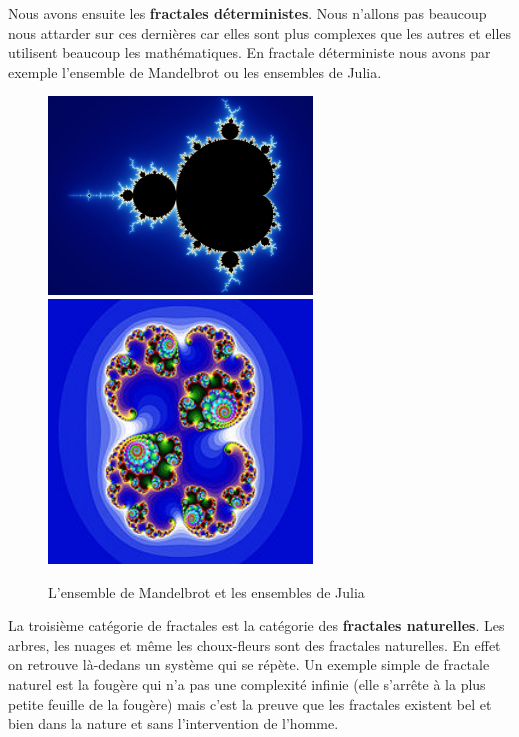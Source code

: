 \documentclass[french,11pt]{report}
\begin{document}
Nous avons ensuite les \textbf{fractales déterministes}. Nous n’allons pas beaucoup nous attarder sur ces dernières car elles sont plus complexes que les autres et elles utilisent beaucoup les mathématiques. En fractale déterministe nous avons par exemple l’ensemble de Mandelbrot ou les ensembles de Julia.
\vspace*{10mm}
\begin{figure} [!h]
    \centering
    \includegraphics[width=7cm]{mandelbrot}
    \label{fig:mandelbrot}
    \includegraphics[width=7cm]{julia}
    \label{fig:julia}
    \caption{L'ensemble de Mandelbrot et les ensembles de Julia}
\end{figure}
\vspace*{10mm}

La troisième catégorie de fractales est la catégorie des \textbf{fractales naturelles}. Les arbres, les nuages et même les choux-fleurs sont des fractales naturelles. En effet on retrouve là-dedans un système qui se répète. Un exemple simple de fractale naturel est la fougère qui n’a pas une complexité infinie (elle s’arrête à la plus petite feuille de la fougère) mais c’est la preuve que les fractales existent bel et bien dans la nature et sans l’intervention de l’homme.
\vspace*{10mm}
\end{document}
